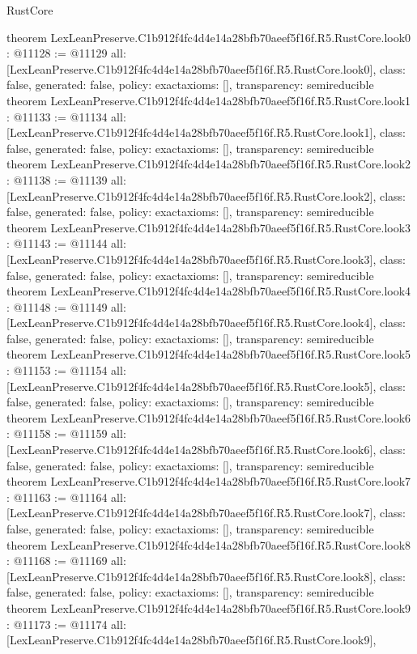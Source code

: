\begin{lexlean}{RustCore}
\begin{coremodule}
{}
theorem LexLeanPreserve.C1b912f4fc4d4e14a28bfb70aeef5f16f.R5.RustCore.look0 : @11128 := @11129 {
  all: [LexLeanPreserve.C1b912f4fc4d4e14a28bfb70aeef5f16f.R5.RustCore.look0],
  class: false,
  generated: false,
  policy: exact{axioms: []},
  transparency: semireducible
}
theorem LexLeanPreserve.C1b912f4fc4d4e14a28bfb70aeef5f16f.R5.RustCore.look1 : @11133 := @11134 {
  all: [LexLeanPreserve.C1b912f4fc4d4e14a28bfb70aeef5f16f.R5.RustCore.look1],
  class: false,
  generated: false,
  policy: exact{axioms: []},
  transparency: semireducible
}
theorem LexLeanPreserve.C1b912f4fc4d4e14a28bfb70aeef5f16f.R5.RustCore.look2 : @11138 := @11139 {
  all: [LexLeanPreserve.C1b912f4fc4d4e14a28bfb70aeef5f16f.R5.RustCore.look2],
  class: false,
  generated: false,
  policy: exact{axioms: []},
  transparency: semireducible
}
theorem LexLeanPreserve.C1b912f4fc4d4e14a28bfb70aeef5f16f.R5.RustCore.look3 : @11143 := @11144 {
  all: [LexLeanPreserve.C1b912f4fc4d4e14a28bfb70aeef5f16f.R5.RustCore.look3],
  class: false,
  generated: false,
  policy: exact{axioms: []},
  transparency: semireducible
}
theorem LexLeanPreserve.C1b912f4fc4d4e14a28bfb70aeef5f16f.R5.RustCore.look4 : @11148 := @11149 {
  all: [LexLeanPreserve.C1b912f4fc4d4e14a28bfb70aeef5f16f.R5.RustCore.look4],
  class: false,
  generated: false,
  policy: exact{axioms: []},
  transparency: semireducible
}
theorem LexLeanPreserve.C1b912f4fc4d4e14a28bfb70aeef5f16f.R5.RustCore.look5 : @11153 := @11154 {
  all: [LexLeanPreserve.C1b912f4fc4d4e14a28bfb70aeef5f16f.R5.RustCore.look5],
  class: false,
  generated: false,
  policy: exact{axioms: []},
  transparency: semireducible
}
theorem LexLeanPreserve.C1b912f4fc4d4e14a28bfb70aeef5f16f.R5.RustCore.look6 : @11158 := @11159 {
  all: [LexLeanPreserve.C1b912f4fc4d4e14a28bfb70aeef5f16f.R5.RustCore.look6],
  class: false,
  generated: false,
  policy: exact{axioms: []},
  transparency: semireducible
}
theorem LexLeanPreserve.C1b912f4fc4d4e14a28bfb70aeef5f16f.R5.RustCore.look7 : @11163 := @11164 {
  all: [LexLeanPreserve.C1b912f4fc4d4e14a28bfb70aeef5f16f.R5.RustCore.look7],
  class: false,
  generated: false,
  policy: exact{axioms: []},
  transparency: semireducible
}
theorem LexLeanPreserve.C1b912f4fc4d4e14a28bfb70aeef5f16f.R5.RustCore.look8 : @11168 := @11169 {
  all: [LexLeanPreserve.C1b912f4fc4d4e14a28bfb70aeef5f16f.R5.RustCore.look8],
  class: false,
  generated: false,
  policy: exact{axioms: []},
  transparency: semireducible
}
theorem LexLeanPreserve.C1b912f4fc4d4e14a28bfb70aeef5f16f.R5.RustCore.look9 : @11173 := @11174 {
  all: [LexLeanPreserve.C1b912f4fc4d4e14a28bfb70aeef5f16f.R5.RustCore.look9],
}
\end{coremodule}
\end{lexlean}
